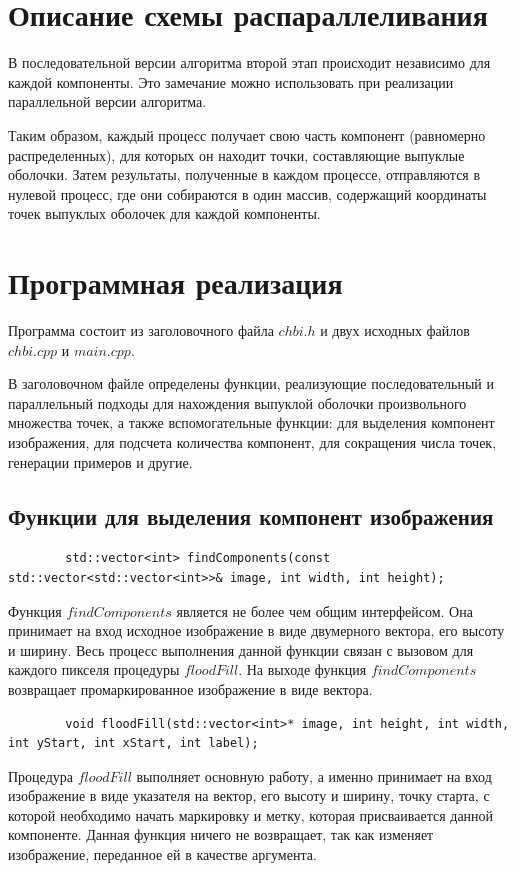 \documentclass[a4paper, 12pt]{extarticle}
\newcommand{\n}{\par}
\begin{document}
	\section{Описание схемы распараллеливания}
	В последовательной версии алгоритма второй этап происходит независимо для каждой компоненты. Это замечание можно использовать при реализации параллельной версии алгоритма.\n
	Таким образом, каждый процесс получает свою часть компонент (равномерно распределенных), для которых он находит точки, составляющие выпуклые оболочки. Затем результаты, полученные в каждом процессе, отправляются в нулевой процесс, где они собираются в один массив, содержащий координаты точек выпуклых оболочек для каждой компоненты.
	\newpage
	\section{Программная реализация}
	Программа состоит из заголовочного файла $chbi.h$ и двух исходных файлов $chbi.cpp$ и $main.cpp$.\n
	В заголовочном файле определены функции, реализующие последовательный и параллельный подходы для нахождения выпуклой оболочки произвольного множества точек, а также вспомогательные функции: для выделения компонент изображения, для подсчета количества компонент, для сокращения числа точек, генерации примеров и другие.
	
	\subsection{Функции для выделения компонент изображения}
	\begin{verbatim}
		std::vector<int> findComponents(const std::vector<std::vector<int>>& image, int width, int height);
	\end{verbatim}
	Функция $findComponents$ является не более чем общим интерфейсом. Она принимает на вход исходное изображение в виде двумерного вектора, его высоту и ширину. Весь процесс выполнения данной функции связан с вызовом для каждого пикселя процедуры $floodFill$. На выходе функция $findComponents$ возвращает промаркированное изображение в виде вектора.
	\begin{verbatim}
		void floodFill(std::vector<int>* image, int height, int width, int yStart, int xStart, int label);
	\end{verbatim}
	Процедура $floodFill$ выполняет основную работу, а именно принимает на вход изображение в виде указателя на вектор, его высоту и ширину, точку старта, с которой необходимо начать маркировку и метку, которая присваивается данной компоненте. Данная функция ничего не возвращает, так как изменяет изображение, переданное ей в качестве аргумента.
	
\end{document}
